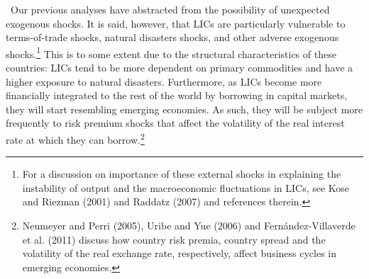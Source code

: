 \documentclass[11pt]{article}
\begin{document}
\quad\ \thinspace Our previous analyses have abstracted from the possibility
of unexpected exogenous shocks. It is said, however, that LICs are
particularly vulnerable to terms-of-trade shocks, natural disasters shocks,
and other adverse exogenous shocks.\footnote{%
For a discussion on importance of these external shocks in explaining the
instability of output and the macroeconomic fluctuations in LICs, see Kose
and Riezman (2001) and Raddatz (2007) and references therein.} This is to
some extent due to the structural characteristics of these countries: LICs
tend to be more dependent on primary commodities and have a higher exposure
to natural disasters. Furthermore, as LICs become more financially
integrated to the rest of the world by borrowing in capital markets, they
will start resembling emerging economies. As such, they will be subject more
frequently to risk premium shocks that affect the volatility of the real
interest rate at which they can borrow.\footnote{%
Neumeyer and Perri (2005), Uribe and Yue (2006) and Fern\'{a}ndez-Villaverde
et al. (2011) discuss how country risk premia, country spread and the
volatility of the real exchange rate, respectively, affect business cycles
in emerging economies.}

\end{document}
